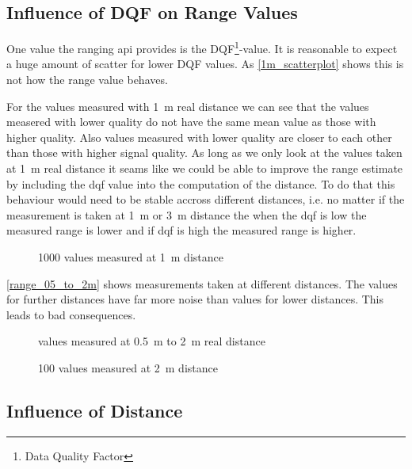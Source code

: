 \subsection{Influence of DQF on Range Values}
One value the ranging api provides is the DQF\footnote{Data Quality Factor}-value.
It is reasonable to expect a huge amount of scatter for lower DQF values.
As \autoref{1m_scatterplot} shows this is not how the range value behaves.

For the values measured with \SI{1}{\metre} real distance we can see that the values measered with lower quality do not have the same mean value as those with higher quality.
Also values measured with lower quality are closer to each other than those with higher signal quality.
As long as we only look at the values taken at \SI{1}{\metre} real distance it seams like we could be able to improve the range estimate by including the dqf value into the computation of the distance.
To do that this behaviour would need to be stable accross different distances, i.e. no matter if the measurement is taken at \SI{1}{\metre} or \SI{3}{\metre} distance the when the dqf is low the measured range is lower and if dqf is high the measured range is higher.
\begin{figure}[H]
	\centering
	
	\caption{1000 values measured at \SI{1}{\metre} distance}
	\label{1m_scatterplot}
\end{figure}

\autoref{range_05_to_2m} shows measurements taken at different distances.
The values for further distances have far more noise than values for lower distances.
This leads to bad consequences.
\begin{figure}[H]
	\centering
	
	\caption{values measured at \SI{0.5}{\metre} to \SI{2}{\metre} real distance}
	\label{range_05_to_2m}
\end{figure}

\begin{figure}[H]
	\centering
	
	\caption{100 values measured at \SI{2}{\metre} distance}
	\label{2m}
\end{figure}

\subsection{Influence of Distance}


